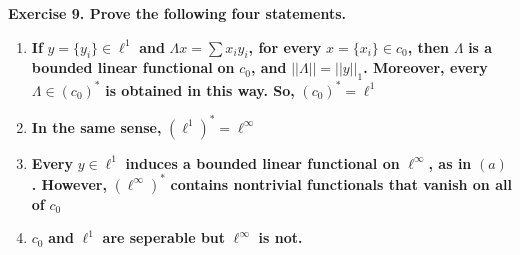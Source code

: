\documentclass{article}
\theoremstyle{definition}
\theoremstyle{remark}
\theoremstyle{definition}
\begin{document}
    \textbf{Exercise 9. Prove the following four statements.}\begin{enumerate}[label = (\alph*)]
        \item \textbf{If} $y=\{y_i\}\in \ell^1$\textbf{ and } $\Lambda x = \sum {x_i}{y_i}$\textbf{, for every }$x = \{x_i\}\in c_0$\textbf{, then }$\Lambda$\textbf{ is a bounded linear functional}
        \textbf{ on }$c_0$\textbf{, and }$||\Lambda || = ||y||_1$\textbf{. Moreover, every }$\Lambda\in {(c_0)}^\ast$\textbf{ is obtained in this way. So, }${(c_0)}^\ast = \ell^1$
        \item \textbf{In the same sense, }${(\ell^1)}^\ast = \ell^\infty$
        \item \textbf{Every }$y\in \ell^1$\textbf{ induces a bounded linear functional on }$\ell^\infty$\textbf{, as in }$(a)$\textbf{. However, }${(\ell^\infty)}^\ast$\textbf{ contains nontrivial functionals that vanish on all of }$c_0$
        \item $c_0$ \textbf{ and }$\ell^1$\textbf{ are seperable but} $\ell^\infty$\textbf{ is not.}
    \end{enumerate}
\end{document}
